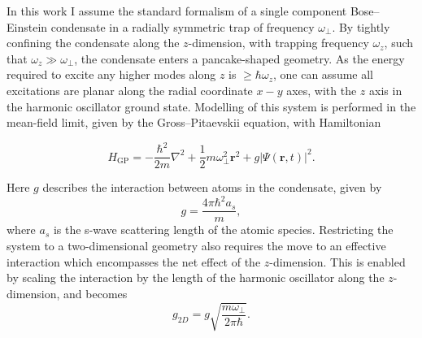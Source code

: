 \iffalse
In this work I assume the standard formalism of a single component Bose--Einstein condensate in a radially symmetric trap of frequency $\omega_\perp$. By tightly confining the condensate along the $z$-dimension, with trapping frequency $\omega_z$, such that $\omega_z \gg \omega_\perp$, the condensate enters a pancake-shaped geometry. As the energy required to excite any higher modes along $z$ is $\geq \hbar\omega_z$, one can assume all excitations are planar along the radial coordinate $x-y$ axes, with the $z$ axis in the harmonic oscillator ground state. Modelling of this system is performed in the mean-field limit, given by the Gross--Pitaevskii equation, with Hamiltonian

\begin{equation}\label{eqn:gpe_h0}
	H_{\mathrm{GP}} = -\frac{\hbar^2}{2m}\nabla^2 + \frac{1}{2}m\omega_{\perp}^2\mathbf{r}^2 + g\vert\Psi(\mathbf{r},t)\vert^2.
\end{equation}

Here $g$ describes the interaction between atoms in the condensate, given by \begin{equation}
g = \frac{4\pi\hbar^2a_s}{m},
\end{equation}
where $a_s$ is the s-wave scattering length of the atomic species. Restricting the system to a two-dimensional geometry also requires the move to an effective interaction which encompasses the net effect of the $z$-dimension. This is enabled by scaling the interaction by the length of the harmonic oscillator along the $z$-dimension, and becomes \cite[pg. 456]{BK:Pethick_smith_}
\begin{equation}
g_{2D} = g\sqrt{\frac{m\omega_\perp}{2\pi\hbar}}.
\end{equation}

